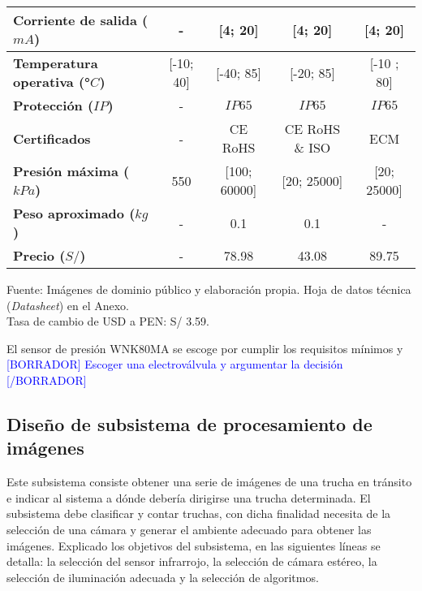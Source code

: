 \begin{itemize}
\begin{mytable}[H]
\begin{tabular}{l|c|c|c|c|}
	 		\multicolumn{1}{|l|}{\textbf{Corriente de salida ($mA$)}} & - & [4; 20] & [4; 20] & [4; 20] \\ \hline
	 		\multicolumn{1}{|l|}{\textbf{Temperatura operativa (°$C$)}} & [-10; 40] & [-40; 85] & [-20; 85] & [-10 ; 80] \\ \hline
	 		\multicolumn{1}{|l|}{\textbf{Protección ($IP$)}} & - & $IP65$ & $IP65$ & $IP65$ \\ \hline
	 		\multicolumn{1}{|l|}{\textbf{Certificados}} & - & CE RoHS & CE RoHS \& ISO & ECM \\ \hline
	 		\multicolumn{1}{|l|}{\textbf{Presión máxima ($kPa$)}} & 550 & [100; 60000] & [20; 25000] & [20; 25000] \\ \hline
	 		\multicolumn{1}{|l|}{\textbf{Peso aproximado ($kg$)}} & - & 0.1 & 0.1 & - \\ \hline
	 		\multicolumn{1}{|l|}{\textbf{Precio ($S/$)}} & - & 78.98 & 43.08 & 89.75 \\ \hline		
	 	\end{tabular}	
	 	\begin{myflushcenteraftertable}			
	 		Fuente: Imágenes de dominio público y elaboración propia. Hoja de datos técnica (\textit{Datasheet}) en el Anexo. \\
	 		Tasa de cambio de USD a PEN: S/ 3.59.
	 	\end{myflushcenteraftertable}
	\end{mytable}
	
	El sensor de presión WNK80MA se escoge por cumplir los requisitos mínimos y \textcolor{blue}{[BORRADOR] Escoger una electroválvula y argumentar la decisión [/BORRADOR]}
	
	
\end{itemize}


\subsection{Diseño de subsistema de procesamiento de imágenes}
\label{ssec:diseno de subsistema de procesamiento de imágenes}

Este subsistema consiste obtener una serie de imágenes de una trucha en tránsito e indicar al sistema a dónde debería dirigirse una trucha determinada. El subsistema debe clasificar y contar truchas, con dicha finalidad necesita de la selección de una cámara y generar el ambiente adecuado para obtener las imágenes. Explicado los objetivos del subsistema, en las siguientes líneas se detalla: la selección del sensor infrarrojo, la selección de cámara estéreo, la selección de iluminación adecuada y la selección de algoritmos.

